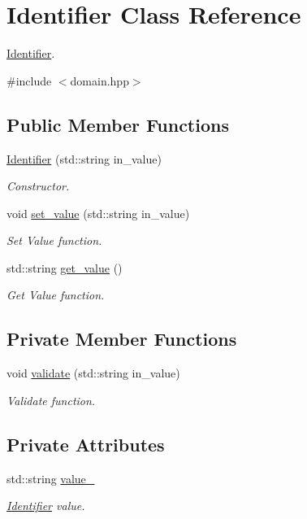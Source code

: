 \hypertarget{classIdentifier}{}\section{Identifier Class Reference}
\label{classIdentifier}


\hyperlink{classIdentifier}{Identifier}.  




{\ttfamily \#include $<$domain.\+hpp$>$}

\subsection*{Public Member Functions}
\begin{DoxyCompactItemize}
\item 
\hyperlink{classIdentifier_a777a5c50de163535df8f8929c85b2050}{Identifier} (std\+::string in\+\_\+value)
\begin{DoxyCompactList}\small\item\em Constructor. \end{DoxyCompactList}\item 
void \hyperlink{classIdentifier_a3b81a3f25b80dfe32cb7c7b116a2c766}{set\+\_\+value} (std\+::string in\+\_\+value)
\begin{DoxyCompactList}\small\item\em Set Value function. \end{DoxyCompactList}\item 
std\+::string \hyperlink{classIdentifier_a02abf893c9b651a8da1990f0e9213c41}{get\+\_\+value} ()
\begin{DoxyCompactList}\small\item\em Get Value function. \end{DoxyCompactList}\end{DoxyCompactItemize}
\subsection*{Private Member Functions}
\begin{DoxyCompactItemize}
\item 
void \hyperlink{classIdentifier_aaf7e66d94e93242e30b6a27ad4b057c1}{validate} (std\+::string in\+\_\+value)
\begin{DoxyCompactList}\small\item\em Validate function. \end{DoxyCompactList}\end{DoxyCompactItemize}
\subsection*{Private Attributes}
\begin{DoxyCompactItemize}
\item 
std\+::string \hyperlink{classIdentifier_acc41cf6f89bc5a8572fa474d2739fa28}{value\+\_\+}
\begin{DoxyCompactList}\small\item\em \hyperlink{classIdentifier}{Identifier} value. \end{DoxyCompactList}\end{DoxyCompactItemize}
